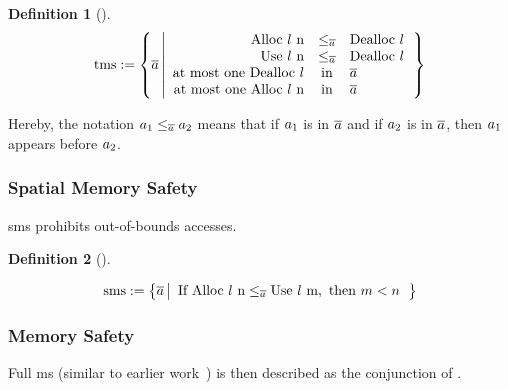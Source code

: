 \documentclass[dvipsnames,conference]{IEEEtran}
\theoremstyle{definition}
\newtheorem{definition}{Definition}[section]
\begin{document}
\begin{definition}[]\label{def:trace:tmsdef}
  $$
  \tmssafe:=\left\{\trace \left| \begin{array}{rcl}
                              \ev{Alloc\ \loc\ n}&\le_{\trace}&\ev{Dealloc\ \loc} \\
                              \ev{Use\ \loc\ n}&\le_{\trace}&\ev{Dealloc\ \loc} \\
                              \text{at most one }\ev{Dealloc\ \loc}&\text{in}&\trace \\
                              \text{at most one }\ev{Alloc\ \loc\ n}&\text{in}&\trace \\
                            \end{array}\right.\right\}
  $$
\end{definition}
Hereby, the notation $\event[_{1}]\le_{\trace}\event[_{2}]$ means that if $\event[_{1}]$ is in $\trace$ and if $\event[_{2}]$ is in $\trace$, then $\event[_{1}]$ appears before $\event[_{2}]$.

\subsubsection{Spatial Memory Safety}

\gls*{sms} prohibits out-of-bounds accesses.

\begin{definition}[]\label{def:trace:smsdef}

  \noindent
  $$
  \smssafe:=\left\{\trace \left|\begin{array}{rcl}
                                  \text{If }\ev{Alloc\ \loc\ n}\le_{\trace}\ev{Use\ \loc\ m}, \text{ then }m<n
                                \end{array}\right.\right\}
                                $$
\end{definition}

\subsubsection{Memory Safety}

Full \gls*{ms} (similar to earlier work~\cite{nagarakatte2009soft,nagarakatte2010cets,jim2002cyclone,necula2005ccured,michael2023mswasm}) is then described as the conjunction of .
\end{document}
